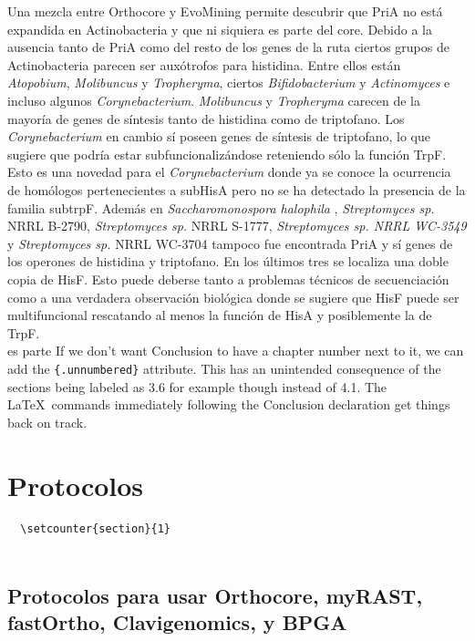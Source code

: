 \documentclass[12pt,twoside]{reedthesis}
\begin{document}
  Una mezcla entre Orthocore y EvoMining permite descubrir que PriA no
  está expandida en Actinobacteria y que ni siquiera es parte del core.
  Debido a la ausencia tanto de PriA como del resto de los genes de la
  ruta ciertos grupos de Actinobacteria parecen ser auxótrofos para
  histidina. Entre ellos están \emph{Atopobium}, \emph{Molibuncus} y
  \emph{Tropheryma}, ciertos \emph{Bifidobacterium} y \emph{Actinomyces} e
  incluso algunos \emph{Corynebacterium}. \emph{Molibuncus} y
  \emph{Tropheryma} carecen de la mayoría de genes de síntesis tanto de
  histidina como de triptofano. Los \emph{Corynebacterium} en cambio sí
  poseen genes de síntesis de triptofano, lo que sugiere que podría estar
  subfuncionalizándose reteniendo sólo la función TrpF. Esto es una
  novedad para el \emph{Corynebacterium} donde ya se conoce la ocurrencia
  de homólogos pertenecientes a subHisA pero no se ha detectado la
  presencia de la familia subtrpF. Además en \emph{Saccharomonospora
  halophila} , \emph{Streptomyces sp.} NRRL B-2790, \emph{Streptomyces
  sp.} NRRL S-1777, \emph{Streptomyces sp. NRRL WC-3549} y
  \emph{Streptomyces sp.} NRRL WC-3704 tampoco fue encontrada PriA y sí
  genes de los operones de histidina y triptofano. En los últimos tres se
  localiza una doble copia de HisF. Esto puede deberse tanto a problemas
  técnicos de secuenciación como a una verdadera observación biológica
  donde se sugiere que HisF puede ser multifuncional rescatando al menos
  la función de HisA y posiblemente la de TrpF.\\
  es parte If we don't want Conclusion to have a chapter number next to
  it, we can add the \texttt{\{.unnumbered\}} attribute. This has an
  unintended consequence of the sections being labeled as 3.6 for example
  though instead of 4.1. The \LaTeX~commands immediately following the
  Conclusion declaration get things back on track.
  
  \chapter{Protocolos}\label{protocolos}
  
  \begin{verbatim}
  \setcounter{section}{1}
                        
  \end{verbatim}
  
  \section{Protocolos para usar Orthocore, myRAST, fastOrtho,
  Clavigenomics, y
  BPGA}\label{protocolos-para-usar-orthocore-myrast-fastortho-clavigenomics-y-bpga}
  
\end{document}
